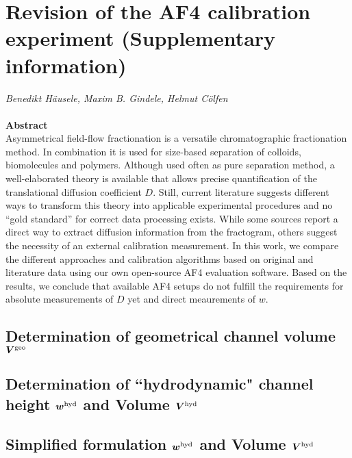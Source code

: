 \chapter*{Revision of the AF4 calibration experiment (Supplementary information)}
  
\emph{Benedikt Häusele, Maxim B. Gindele, Helmut Cölfen}\\
\noindent\hrulefill\\
\textbf{Abstract}\\

Asymmetrical field-flow fractionation is a versatile chromatographic fractionation method. In combination it is used 
for size-based separation of colloids, biomolecules and polymers. Although used often as pure separation method, a 
well-elaborated theory is available that allows precise quantification of the translational diffusion coefficient $D$. 
Still, current literature suggests different ways to transform this theory into applicable experimental procedures and 
no “gold standard” for correct data processing exists. While some sources report a direct way to extract diffusion 
information from the fractogram, others suggest the necessity of an external calibration measurement. In this work, we 
compare the different approaches and calibration algorithms based on original and literature data using our own 
open-source AF4 evaluation software. Based on the results, we conclude that available AF4 setups do not fulfill the 
requirements for absolute measurements of $D$ yet and direct meaurements of $w$.

\noindent\hrulefill
\section*{Determination of geometrical channel volume $\bm{V^\text{geo}}$}


\clearpage
\section*{Determination of ``hydrodynamic" channel height $\bm{w^\text{hyd}}$ and Volume $\bm{V^\text{hyd}}$}


\section*{Simplified formulation $\bm{w^\text{hyd}}$ and Volume $\bm{V^\text{hyd}}$}



